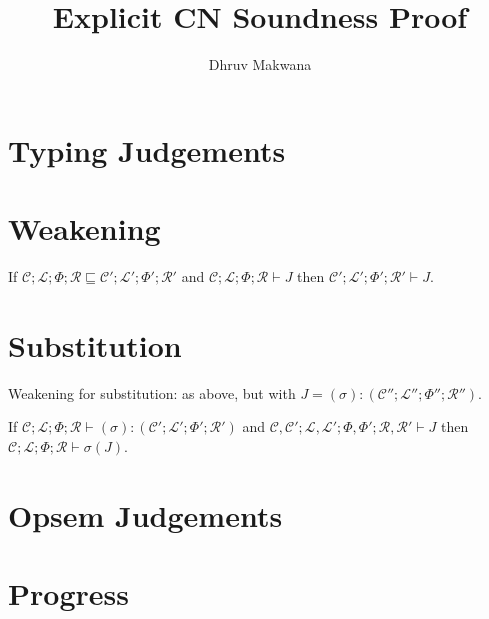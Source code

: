 \documentclass[11pt]{article}%
\title{Explicit CN Soundness Proof}
\author{Dhruv Makwana}
\newcommand{\ctxC}{\mathcal{C}}%
\newcommand{\ctxL}{\mathcal{L}}%
\newcommand{\ctxN}{\Phi}%
\newcommand{\ctxR}{\mathcal{R}}%
\begin{document}
%

\maketitle

\section{Typing Judgements}

\cngrammartabular{
\cnobjectXXvalueXXjtype\cninterrule%
\cnpvalXXjtype\cninterrule%
\cnresXXjtype\cninterrule%
\cnspineXXjtype\cninterrule%
\cnpexprXXjtype\cninterrule%
\cntpvalXXjtype\cninterrule%
\cntpexprXXjtype\cninterrule%
\cnactionXXjtype\cninterrule%
\cnmemopXXjtype\cninterrule%
\cnseqXXexprXXjtype\cninterrule%
\cnisXXexprXXjtype\cninterrule%
\cntvalXXjtype\cninterrule%
\cntexprXXjtype\cninterrule%
}

\section{Weakening}

If $\ctxC ; \ctxL ; \ctxN ; \ctxR \sqsubseteq \ctxC' ; \ctxL' ; \ctxN' ;
\ctxR'$ and $\ctxC ; \ctxL ; \ctxN ; \ctxR \vdash J$ then $\ctxC' ; \ctxL' ;
\ctxN' ; \ctxR' \vdash J$.

\section{Substitution}

Weakening for substitution: as above, but with $J= ( \sigma ) : ( \ctxC'' ;
\ctxL'' ; \ctxN'' ; \ctxR'' )$.


If $\ctxC ; \ctxL ; \ctxN ; \ctxR \vdash ( \sigma ) : ( \ctxC' ; \ctxL' ;
\ctxN' ; \ctxR')$ and $\ctxC , \ctxC' ; \ctxL, \ctxL' ; \ctxN, \ctxN' ; \ctxR,
\ctxR' \vdash J$ then $\ctxC ; \ctxL ; \ctxN ; \ctxR \vdash \sigma ( J )$. 

\section{Opsem Judgements}

\cngrammartabular{
\cnpureXXopsemXXjtype\cninterrule%
\cnopsemXXjtype\cninterrule%
}

\section{Progress}
\end{document}

